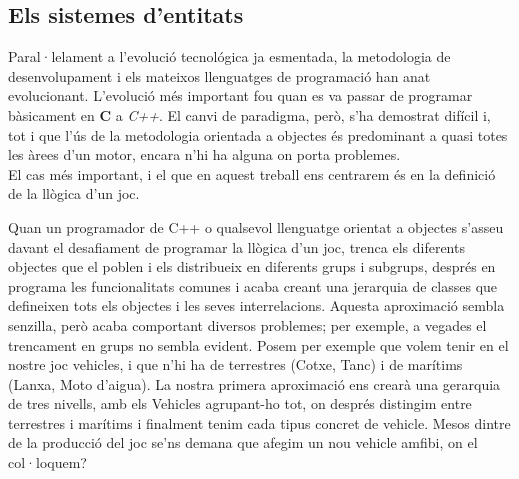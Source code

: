\subsection{Els sistemes d'entitats}

Paral·lelament a l'evolució tecnológica ja esmentada, la metodologia de desenvolupament i els mateixos llenguatges de programació han anat evolucionant. L'evolució més important fou quan es va passar de programar bàsicament en {\bf C} a {\em C++}. El canvi de paradigma, però, s'ha demostrat difícil i, tot i que l'ús de la metodologia orientada a objectes és predominant a quasi totes les àrees d'un motor, encara n'hi ha alguna on porta problemes.
\\

El cas més important, i el que en aquest treball ens centrarem és en la definició de la llògica d'un joc.

Quan un programador de {C++} o qualsevol llenguatge orientat a objectes s'asseu davant el desafiament de programar la llògica d'un joc, trenca els diferents objectes que el poblen i els distribueix en diferents grups i subgrups, després en programa les funcionalitats comunes i acaba creant una jerarquia de classes que defineixen tots els objectes i les seves interrelacions. 
Aquesta aproximació sembla senzilla, però acaba comportant diversos problemes; per exemple, a vegades el trencament en grups no sembla evident. Posem per exemple que volem tenir en el nostre joc vehicles, i que n'hi ha de terrestres (Cotxe, Tanc) i de marítims (Lanxa, Moto d'aigua). La nostra primera aproximació ens crearà una gerarquia de tres nivells, amb els Vehicles agrupant-ho tot, on després distingim entre terrestres i marítims i finalment tenim cada tipus concret de vehicle. Mesos dintre de la producció del joc se'ns demana que afegim un nou vehicle amfibi, on el col·loquem?